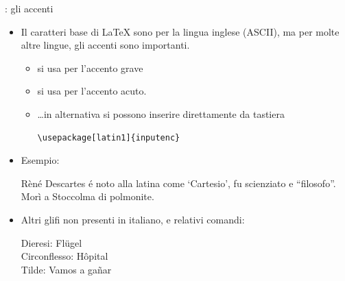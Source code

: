 \documentclass{beamer}
\begin{document}
\begin{frame}[fragile]{\insertsubsection{}: gli accenti}
\small
\begin{itemize}
\item Il caratteri base di \LaTeX{} sono per la lingua inglese (ASCII), ma per molte altre lingue, gli accenti sono importanti.
\begin{itemize}
\item {} si usa per l'accento grave
\item {} si usa per l'accento acuto.
\item \ldots in alternativa si possono inserire direttamente da tastiera
\begin{verbatim}
\usepackage[latin1]{inputenc}
\end{verbatim}
\end{itemize}
\item Esempio:
\begin{exampletwouptiny}
R\`{e}n\'{e} Descartes \'{e} noto
alla latina come `Cartesio', 
fu scienziato e ``filosofo''.
Mor\`{i} a Stoccolma di polmonite.
\end{exampletwouptiny}

\item Altri glifi non presenti in italiano, e relativi comandi:
\begin{exampletwouptiny}
Dieresi: Fl\"ugel\\
Circonflesso: H\^opital\\
Tilde: Vamos a ga\~nar\\
\end{exampletwouptiny}
\end{itemize}
\end{frame}
\end{document}
